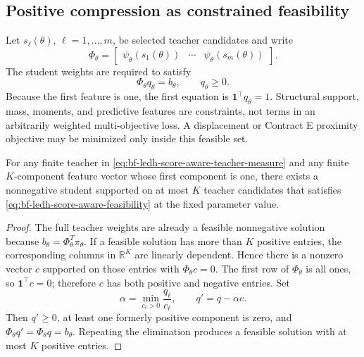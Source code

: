 \subsection{Positive compression as constrained feasibility}

Let \(s_\ell(\theta)\), \(\ell=1,\ldots,m\), be selected teacher candidates and
write
\begin{equation}
\label{eq:bf-ledh-score-aware-feature-matrix}
  \Phi_\theta
  =\begin{bmatrix}
    \psi_\theta(s_1(\theta))&\cdots&\psi_\theta(s_m(\theta))
  \end{bmatrix}.
\end{equation}
The student weights are required to satisfy
\begin{equation}
\label{eq:bf-ledh-score-aware-feasibility}
  \Phi_\theta q_\theta=b_\theta,\qquad q_\theta\geq0.
\end{equation}
Because the first feature is one, the first equation is
\(\mathbf1^\top q_\theta=1\).  Structural support, mass, moments, and predictive
features are constraints, not terms in an arbitrarily weighted multi-objective
loss.  A displacement or Contract E proximity objective may be minimized only
inside this feasible set.

\begin{proposition}
\label{prop:bf-ledh-score-aware-positive-coreset}
For any finite teacher in
\eqref{eq:bf-ledh-score-aware-teacher-measure} and any finite \(K\)-component
feature vector whose first component is one, there exists a nonnegative student
supported on at most \(K\) teacher candidates that satisfies
\eqref{eq:bf-ledh-score-aware-feasibility} at the fixed parameter value.
\end{proposition}

\begin{proof}
The full teacher weights are already a feasible nonnegative solution because
\(b_\theta=\Phi^T_\theta\pi_\theta\).  If a feasible solution has more than \(K\)
positive entries, the corresponding columns in \(\mathbb R^K\) are linearly
dependent.  Hence there is a nonzero vector \(c\) supported on those entries
with \(\Phi_\theta c=0\).  The first row of \(\Phi_\theta\) is all ones, so
\(\mathbf1^\top c=0\); therefore \(c\) has both positive and negative entries.
Set
\[
  \alpha=\min_{c_\ell>0}\frac{q_\ell}{c_\ell},\qquad
  q'=q-\alpha c.
\]
Then \(q'\geq0\), at least one formerly positive component is zero, and
\(\Phi_\theta q'=\Phi_\theta q=b_\theta\).  Repeating the elimination produces
a feasible solution with at most \(K\) positive entries.
\end{proof}

